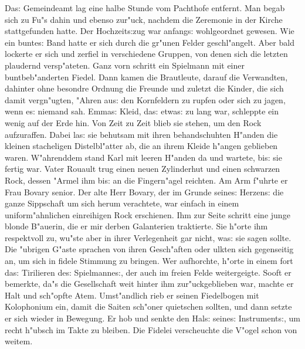\documentclass[oneside,12pt]{book}
\newcommand{\s}{s:}%
\begin{document}
Da{\s} Gemeindeamt lag eine halbe Stunde vom Pachthofe entfernt.
Man begab sich zu Fu"s dahin und ebenso zur"uck, nachdem die
Zeremonie in der Kirche stattgefunden hatte. Der Hochzeit{\s}zug
war anfang{\s} wohlgeordnet gewesen. Wie ein bunte{\s} Band hatte
er sich durch die gr"unen Felder geschl"angelt. Aber bald lockerte
er sich und zerfiel in verschiedene Gruppen, von denen sich die
letzten plaudernd versp"ateten. Ganz vorn schritt ein Spielmann
mit einer buntbeb"anderten Fiedel. Dann kamen die Brautleute,
darauf die Verwandten, dahinter ohne besondre Ordnung die Freunde
und zuletzt die Kinder, die sich damit vergn"ugten, "Ahren au{\s}
den Kornfeldern zu rupfen oder sich zu jagen, wenn e{\s} niemand
sah. Emma{\s} Kleid, da{\s} etwa{\s} zu lang war, schleppte ein
wenig auf der Erde hin. Von Zeit zu Zeit blieb sie stehen, um den
Rock aufzuraffen. Dabei la{\s} sie behutsam mit ihren
behandschuhten H"anden die kleinen stacheligen Distelbl"atter ab,
die an ihrem Kleide h"angen geblieben waren. W"ahrenddem stand
Karl mit leeren H"anden da und wartete, bi{\s} sie fertig war.
Vater Rouault trug einen neuen Zylinderhut und einen schwarzen
Rock, dessen "Armel ihm bi{\s} an die Fingern"agel reichten. Am
Arm f"uhrte er Frau Bovary senior. Der alte Herr Bovary, der im
Grunde seine{\s} Herzen{\s} die ganze Sippschaft um sich herum
verachtete, war einfach in einem uniform"ahnlichen einreihigen
Rock erschienen. Ihm zur Seite schritt eine junge blonde B"auerin,
die er mir derben Galanterien traktierte. Sie h"orte ihm
respektvoll zu, wu"ste aber in ihrer Verlegenheit gar nicht,
wa{\s} sie sagen sollte. Die "ubrigen G"aste sprachen von ihren
Gesch"aften oder ulkten sich gegenseitig an, um sich in fidele
Stimmung zu bringen. Wer aufhorchte, h"orte in einem fort da{\s}
Tirilieren de{\s} Spielmanne{\s}, der auch im freien Felde
weitergeigte. Sooft er bemerkte, da"s die Gesellschaft weit hinter
ihm zur"uckgeblieben war, machte er Halt und sch"opfte Atem.
Umst"andlich rieb er seinen Fiedelbogen mit Kolophonium ein, damit
die Saiten sch"oner quietschen sollten, und dann setzte er sich
wieder in Bewegung. Er hob und senkte den Hal{\s} seine{\s}
Instrument{\s}, um recht h"ubsch im Takte zu bleiben. Die Fidelei
verscheuchte die V"ogel schon von weitem.
\end{document}
